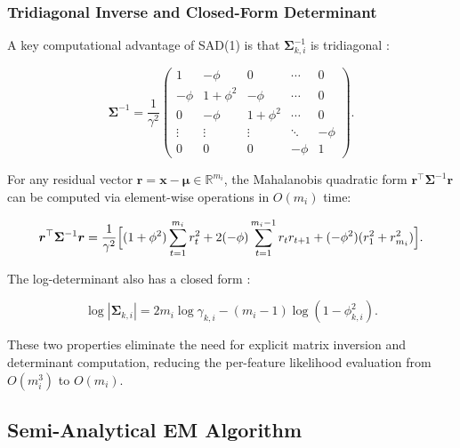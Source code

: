 \documentclass[12pt,a4paper]{article}
\begin{document}
\subsubsection{Tridiagonal Inverse and Closed-Form Determinant}

A key computational advantage of SAD(1) is that $\bm{\Sigma}_{k,i}^{-1}$ is tridiagonal \cite{nunez1997longitudinal}:

\begin{equation}\label{eq:sad_inv}
    \bm{\Sigma}^{-1} =
    \frac{1}{\gamma^2}
    \begin{pmatrix}
        1 & -\phi & 0 & \cdots & 0 \\
        -\phi & 1+\phi^2 & -\phi & \cdots & 0 \\
        0 & -\phi & 1+\phi^2 & \cdots & 0 \\
        \vdots & \vdots & \vdots & \ddots & -\phi \\
        0 & 0 & 0 & -\phi & 1
    \end{pmatrix}.
\end{equation}

For any residual vector $\bm{r} = \bm{x} - \bm{\mu} \in \mathbb{R}^{m_i}$, the Mahalanobis quadratic form $\bm{r}^\top \bm{\Sigma}^{-1} \bm{r}$ can be computed via element-wise operations in $O(m_i)$ time:

\begin{equation}\label{eq:quad_form}
    \bm{r}^\top \bm{\Sigma}^{-1} \bm{r} =
    \frac{1}{\gamma^2} \Bigl[
        (1 + \phi^2) \sum_{t=1}^{m_i} r_t^2
        + 2(-\phi) \sum_{t=1}^{m_i-1} r_t r_{t+1}
        + (-\phi^2) (r_1^2 + r_{m_i}^2)
    \Bigr].
\end{equation}

The log-determinant also has a closed form \cite{nunez1997longitudinal}:

\begin{equation}\label{eq:logdet}
    \log|\bm{\Sigma}_{k,i}| = 2 m_i \log \gamma_{k,i} - (m_i - 1) \log(1 - \phi_{k,i}^2).
\end{equation}

These two properties eliminate the need for explicit matrix inversion and determinant computation, reducing the per-feature likelihood evaluation from $O(m_i^3)$ to $O(m_i)$.

\subsection{Semi-Analytical EM Algorithm}
\end{document}
